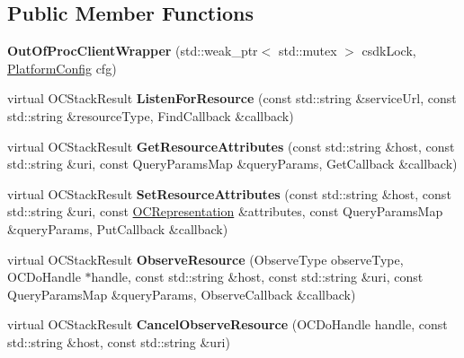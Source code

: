 \subsection*{Public Member Functions}
\begin{DoxyCompactItemize}
\item 
\hypertarget{classOC_1_1OutOfProcClientWrapper_a4d6728f802b9a06d1a35eb240fc1ca97}{}{\bfseries Out\+Of\+Proc\+Client\+Wrapper} (std\+::weak\+\_\+ptr$<$ std\+::mutex $>$ csdk\+Lock, \hyperlink{structOC_1_1PlatformConfig}{Platform\+Config} cfg)\label{classOC_1_1OutOfProcClientWrapper_a4d6728f802b9a06d1a35eb240fc1ca97}

\item 
\hypertarget{classOC_1_1OutOfProcClientWrapper_aa0e27789618d48ca5c40554b91b79666}{}virtual O\+C\+Stack\+Result {\bfseries Listen\+For\+Resource} (const std\+::string \&service\+Url, const std\+::string \&resource\+Type, Find\+Callback \&callback)\label{classOC_1_1OutOfProcClientWrapper_aa0e27789618d48ca5c40554b91b79666}

\item 
\hypertarget{classOC_1_1OutOfProcClientWrapper_a79d0602b43dfa5e832cce1562b301b1e}{}virtual O\+C\+Stack\+Result {\bfseries Get\+Resource\+Attributes} (const std\+::string \&host, const std\+::string \&uri, const Query\+Params\+Map \&query\+Params, Get\+Callback \&callback)\label{classOC_1_1OutOfProcClientWrapper_a79d0602b43dfa5e832cce1562b301b1e}

\item 
\hypertarget{classOC_1_1OutOfProcClientWrapper_a2d46393d23661e184353f8f8689b2c43}{}virtual O\+C\+Stack\+Result {\bfseries Set\+Resource\+Attributes} (const std\+::string \&host, const std\+::string \&uri, const \hyperlink{classOC_1_1OCRepresentation}{O\+C\+Representation} \&attributes, const Query\+Params\+Map \&query\+Params, Put\+Callback \&callback)\label{classOC_1_1OutOfProcClientWrapper_a2d46393d23661e184353f8f8689b2c43}

\item 
\hypertarget{classOC_1_1OutOfProcClientWrapper_aafcad1f35ca292ecf713bfa57119792d}{}virtual O\+C\+Stack\+Result {\bfseries Observe\+Resource} (Observe\+Type observe\+Type, O\+C\+Do\+Handle $\ast$handle, const std\+::string \&host, const std\+::string \&uri, const Query\+Params\+Map \&query\+Params, Observe\+Callback \&callback)\label{classOC_1_1OutOfProcClientWrapper_aafcad1f35ca292ecf713bfa57119792d}

\item 
\hypertarget{classOC_1_1OutOfProcClientWrapper_a843a43b35a597eef9388758c38349098}{}virtual O\+C\+Stack\+Result {\bfseries Cancel\+Observe\+Resource} (O\+C\+Do\+Handle handle, const std\+::string \&host, const std\+::string \&uri)\label{classOC_1_1OutOfProcClientWrapper_a843a43b35a597eef9388758c38349098}


\end{DoxyCompactItemize}
